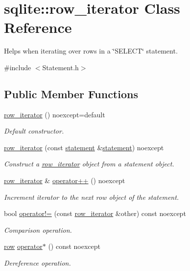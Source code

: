 \hypertarget{a00012}{\section{sqlite\-:\-:row\-\_\-iterator Class Reference}
\label{a00012}
}


Helps when iterating over rows in a \char`\"{}\-S\-E\-L\-E\-C\-T\char`\"{} statement.  




{\ttfamily \#include $<$Statement.\-h$>$}

\subsection*{Public Member Functions}
\begin{DoxyCompactItemize}
\item 
\hypertarget{a00012_a02cfc59ac9cfeb41adbd7c28be6a6200}{\hyperlink{a00012_a02cfc59ac9cfeb41adbd7c28be6a6200}{row\-\_\-iterator} () noexcept=default}\label{a00012_a02cfc59ac9cfeb41adbd7c28be6a6200}

\begin{DoxyCompactList}\small\item\em Default constructor. \end{DoxyCompactList}\item 
\hyperlink{a00012_aa4ac6c92c4db3e59cea7984d8db3d587}{row\-\_\-iterator} (const \hyperlink{a00013}{statement} \&\hyperlink{a00013}{statement}) noexcept
\begin{DoxyCompactList}\small\item\em Construct a \hyperlink{a00012}{row\-\_\-iterator} object from a statement object. \end{DoxyCompactList}\item 
\hypertarget{a00012_a5485c5c0f9f04cbff43dfb285dc6e776}{\hyperlink{a00012}{row\-\_\-iterator} \& \hyperlink{a00012_a5485c5c0f9f04cbff43dfb285dc6e776}{operator++} () noexcept}\label{a00012_a5485c5c0f9f04cbff43dfb285dc6e776}

\begin{DoxyCompactList}\small\item\em Increment iterator to the next row object of the statement. \end{DoxyCompactList}\item 
\hypertarget{a00012_a618bc4f69040dcc2658719ab1a721be1}{bool \hyperlink{a00012_a618bc4f69040dcc2658719ab1a721be1}{operator!=} (const \hyperlink{a00012}{row\-\_\-iterator} \&other) const noexcept}\label{a00012_a618bc4f69040dcc2658719ab1a721be1}

\begin{DoxyCompactList}\small\item\em Comparison operation. \end{DoxyCompactList}\item 
\hyperlink{a00011}{row} \hyperlink{a00012_a5f2c042f06e9e03db0c24e9f1eee3e13}{operator$\ast$} () const noexcept
\begin{DoxyCompactList}\small\item\em Dereference operation. \end{DoxyCompactList}\end{DoxyCompactItemize}


